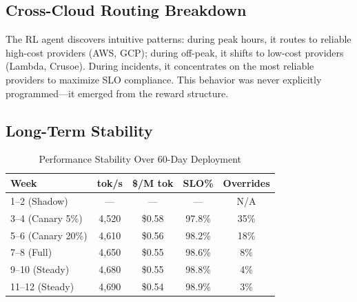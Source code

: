 \documentclass[conference,10pt]{IEEEtran}
\begin{document}
\subsection{Cross-Cloud Routing Breakdown}

\begin{table}[!htbp]
\caption{Macro-Agent Routing Decisions (60-Day Summary)}
\label{tab:routing}
\centering\scriptsize
{}
\end{table}

The RL agent discovers intuitive patterns: during peak hours, it routes to reliable high-cost providers (AWS, GCP); during off-peak, it shifts to low-cost providers (Lambda, Crusoe). During incidents, it concentrates on the most reliable providers to maximize SLO compliance. This behavior was never explicitly programmed---it emerged from the reward structure.

\subsection{Long-Term Stability}

\begin{table}[!htbp]
\caption{Performance Stability Over 60-Day Deployment}
\label{tab:stability}
\centering\scriptsize
\begin{tabular}{@{}lcccc@{}}
\toprule
\textbf{Week} & \textbf{tok/s} & \textbf{\$/M tok} & \textbf{SLO\%} & \textbf{Overrides} \\
\midrule
1--2 (Shadow) & --- & --- & --- & N/A \\
3--4 (Canary 5\%) & 4,520 & \$0.58 & 97.8\% & 35\% \\
5--6 (Canary 20\%) & 4,610 & \$0.56 & 98.2\% & 18\% \\
7--8 (Full) & 4,650 & \$0.55 & 98.6\% & 8\% \\
9--10 (Steady) & 4,680 & \$0.55 & 98.8\% & 4\% \\
11--12 (Steady) & 4,690 & \$0.54 & 98.9\% & 3\% \\
\bottomrule
\end{tabular}
\end{table}
\end{document}

